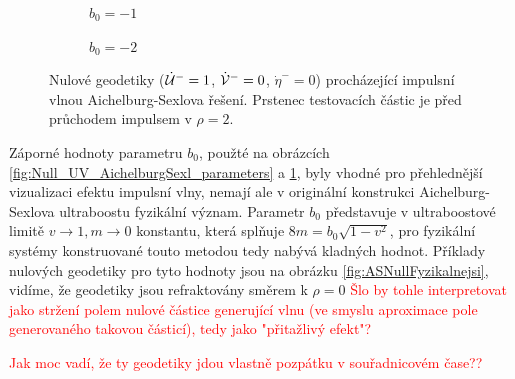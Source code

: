 \begin{figure}[h]
    \centering
    \begin{subfigure}[b]{0.45\textwidth}
        \caption{$b_0 = -1$}
    \end{subfigure}
    \hfill
    \begin{subfigure}[b]{0.45\textwidth}
        \caption{$b_0 = -2$}
    \end{subfigure}
    \caption{Nulové geodetiky ($\dot {\mathcal{U}}^-=1$, $\dot {\mathcal{V}}^-=0$, $\dot \eta^-=0$) procházející impulsní vlnou Aichelburg-Sexlova řešení. Prstenec testovacích částic je před průchodem impulsem v $\rho=2$.}
    \label{fig:NullASRing01}
\end{figure}

Záporné hodnoty parametru $b_0$, použté na obrázcích \ref{fig:Null_UV_AichelburgSexl_parameters} a \ref{fig:NullASRing01}, byly vhodné pro přehlednější vizualizaci
efektu impulsní vlny, nemají ale v originální konstrukci Aichelburg-Sexlova ultraboostu fyzikální význam. Parametr $b_0$
představuje v ultraboostové limitě $v \to 1, m \to 0$ konstantu, která splňuje $8m = b_0\sqrt{1-v^2}$, pro fyzikální systémy konstruované touto metodou
tedy nabývá kladných hodnot. Příklady nulových geodetiky pro tyto hodnoty jsou na obrázku \ref{fig:ASNullFyzikalnejsi}, vidíme,
že geodetiky jsou refraktovány směrem k $\rho=0$ \textcolor{red}{Šlo by tohle interpretovat jako stržení polem nulové částice generující vlnu (ve smyslu aproximace
pole generovaného takovou částicí), tedy jako "přitažlivý efekt"?}

\textcolor{red}{Jak moc vadí, že ty geodetiky jdou vlastně pozpátku v souřadnicovém čase??}


